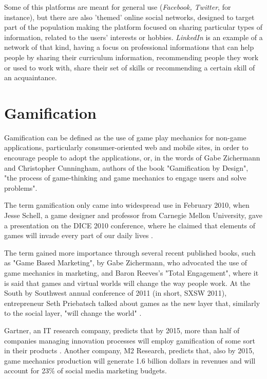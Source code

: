 Some of this platforms are meant for general use (\emph{Facebook, Twitter}, for instance), but there are also 'themed' online social networks, designed to target part of the population making the platform focused on sharing particular types of information, related to the users' interests or hobbies. \emph{LinkedIn} is an example of a network of that kind, having a focus on professional informations that can help people by sharing their curriculum information, recommending people they work or used to work with, share their set of skills or recommending a certain skill of an acquaintance.


\section{Gamification} \label{sec:gam} 

Gamification can be defined as the use of game play mechanics for non-game applications, particularly consumer-oriented web and mobile sites, in order to encourage people to adopt the applications, or, in the words of Gabe Zichermann and Christopher Cunningham, authors of the book "Gamification by Design", "the process of game-thinking and game mechanics to engage users and solve problems".

The term gamification only came into widespread use in February 2010, when Jesse Schell, a game designer and professor from Carnegie Mellon University, gave a presentation on the DICE 2010 conference, where he claimed that elements of games will invade every part of our daily lives \cite{kn:Sch10}.

The term gained more importance through several recent published books, such as "Game Based Marketing", by Gabe Zichermann, who advocated the use of game mechanics in marketing, and Baron Reeves's "Total Engagement", where it is said that games  and virtual worlds will change the way people work. At the South by Southwest annual conference of 2011 (in short, SXSW 2011), entrepreneur Seth Priebatsch talked about games as the new layer that, similarly to the social layer, "will change the world" \cite{kn:Xu12}.

Gartner, an IT research company, predicts that by 2015, more than half of companies managing innovation processes will employ gamification of some sort in their products \cite{kn:Xu12}. Another company, M2 Research, predicts that, also by 2015, game mechanics production will generate 1.6 billion dollars in revenues and will account for 23\% of social media marketing budgets. 


